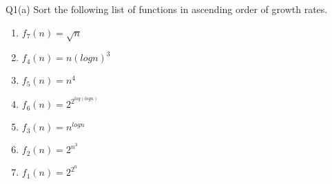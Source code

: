 \begin{problem}
  {Q1(a)}
    Sort the following list of functions in ascending order of growth rates.\\
      \begin{enumerate}
        \item $f_7(n) = \sqrt{n}$
        \item $f_4(n) = n(logn)^3$
        \item $f_5(n) = n^4$
        \item $f_6(n) = 2^{2^{log(logn)}}$
        \item $f_3(n) = n^{logn}$
        \item $f_2(n) = 2^{n^3}$
        \item $f_1(n) = 2^{2^n}$
      \end{enumerate}
\end{problem}
